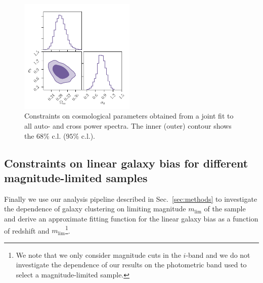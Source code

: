 \documentclass[a4paper,11pt]{article}
\begin{document}
    \begin{figure}
      \begin{center}
        \includegraphics[width=0.49\textwidth]{figures/contours-Om-s8_mPk=HOD_fix=alpha-fc-sigmaM_HOD=zevol_fit=pz-shifts+prior=0p2-pz-widths+prior=0p2_fit=auto+cross_cosmo=const-LINBIAS_HOD-param=zfid_clfit=HOD-zevol_fit=Oc+s8.pdf}
        \caption{Constraints on cosmological parameters obtained from a joint fit to all auto- and cross power spectra. The inner (outer) contour shows the $68 \%$ c.l. ($95 \%$ c.l.).}
        \label{fig:constraints-fit=Oc+s8}
      \end{center}
    \end{figure} 
    
\subsection{Constraints on linear galaxy bias for different magnitude-limited samples}\label{ssec:results.mag_cuts}

Finally we use our analysis pipeline described in Sec.~\ref{sec:methods} to investigate the dependence of galaxy clustering on limiting magnitude $m_{\mathrm{lim}}$ of the sample and derive an approximate fitting function for the linear galaxy bias as a function of redshift and $m_{\mathrm{lim}}$\footnote{We note that we only consider magnitude cuts in the $i$-band and we do not investigate the dependence of our results on the photometric band used to select a magnitude-limited sample.}. 
\end{document}
